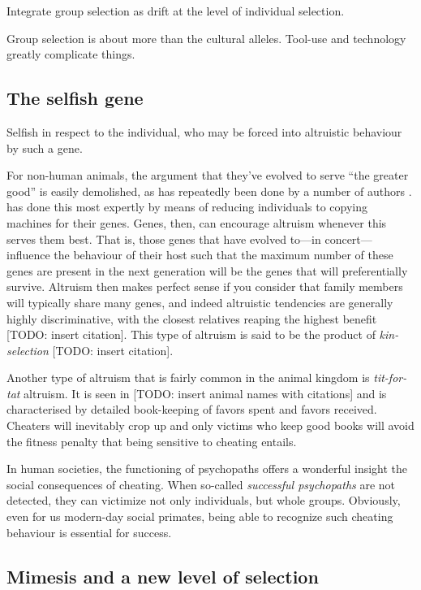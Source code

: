 \documentclass{article}
\begin{document}
Integrate group selection as drift at the level of individual selection.

Group selection is about more than the cultural alleles. Tool-use and technology greatly complicate things.

\subsection{The selfish gene}
\label{sec:genes}

Selfish in respect to the individual, who may be forced into altruistic behaviour by such a gene.

For non-human animals, the argument that they've evolved to serve “the greater
good” is easily demolished, as has repeatedly been done by a number of authors
\citep{dawkins1976,}. \citet{dawkins1976} has done this most expertly by
means of reducing individuals to copying machines for their genes. Genes, then,
can encourage altruism whenever this serves them best. That is, those genes
that have evolved to---in concert---influence the behaviour of their host such
that the maximum number of these genes are present in the next generation will
be the genes that will preferentially survive. Altruism then makes perfect
sense if you consider that family members will typically share many genes, and
indeed altruistic tendencies are generally highly discriminative, with the
closest relatives reaping the highest benefit [TODO: insert citation]. This
type of altruism is said to be the product of \emph{kin-selection} [TODO:
insert citation].

Another type of altruism that is fairly common in the animal kingdom is
\emph{tit-for-tat} altruism. It is seen in [TODO: insert animal names with
citations] and is characterised by detailed book-keeping of favors spent and
favors received. Cheaters will inevitably crop up and only victims who keep
good books will avoid the fitness penalty that being sensitive to cheating
entails.

In human societies, the functioning of psychopaths offers a wonderful insight
the social consequences of cheating. When so-called \emph{successful
psychopaths} are not detected, they can victimize not only individuals, but
whole groups. Obviously, even for us modern-day social primates, being able to
recognize such cheating behaviour is essential for success.

\subsection{Mimesis and a new level of selection}
\end{document}
